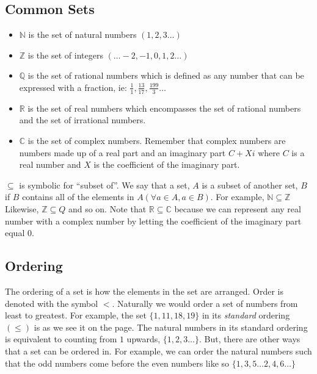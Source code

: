 \documentclass[12pt]{report}
\begin{document}
\subsection{Common Sets}
\begin{itemize}
    \item $\mathbb{N}$ is the set of natural numbers $(1,2,3 \dots)$
    \item $\mathbb{Z}$ is the set of integers $(\dots -2,-1,0,1,2 \dots )$
    \item $\mathbb{Q}$ is the set of rational numbers which is defined as any number that can be expressed with a fraction, ie: $\frac{1}{1}, \frac{13}{17}, \frac{199}{3} \dots $
    \item $\mathbb{R}$ is the set of real numbers which encompasses the set of rational numbers and the set of irrational numbers.
    \item $\mathbb{C}$ is the set of complex numbers. Remember that complex numbers are numbers made up of a real part and an imaginary part $C + Xi$ where $C$ is a real number and $X$ is the coefficient of the imaginary part.
\end{itemize}

$\subseteq$ is symbolic for ``subset of''. We say that a set, $A$ is a subset of another set, $B$ if $B$ contains all of the elements in $A$\hspace{5pt}$(\forall a \in A, a \in B)$. For example, $\mathbb{N} \subseteq \mathbb{Z}$ Likewise, $\mathbb{Z} \subseteq {Q}$ and so on. Note that $\mathbb{R} \subseteq \mathbb{C}$ because we can represent any real number with a complex number by letting the coefficient of the imaginary part equal $0$.

\subsection{Ordering}

\hspace*{\parindent}The ordering of a set is how the elements in the set are arranged. Order is denoted with the symbol $<$. Naturally we would order a set of numbers from least to greatest. For example, the set $\{1, 11, 18, 19\}$ in its \textit{standard} ordering $(\leqslant)$ is as we see it on the page. The natural numbers in its standard ordering is equivalent to counting from $1$ upwards, $\{1, 2,3 \dots\}$. But, there are other ways that a set can be ordered in. For example, we can order the natural numbers such that the odd numbers come before the even numbers like so $\{1, 3, 5 \dots 2, 4, 6 \dots \}$
\end{document}
